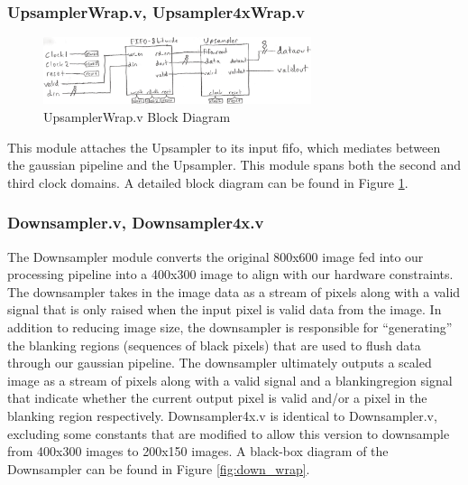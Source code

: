 \documentclass[12pt]{article}
\begin{document}
\subsubsection{UpsamplerWrap.v, Upsampler4xWrap.v}


\begin{figure}
    \centering
    \includegraphics[width=0.7\textwidth]{processed_image_pngs/UpsamplerWrap.png}
    \caption{UpsamplerWrap.v Block Diagram}
    \label{fig:up_wrap}
\end{figure}


This module attaches the Upsampler to its input fifo, which mediates between
the gaussian pipeline and the Upsampler. This module spans both the second and
third clock domains. A detailed block diagram can be found in Figure \ref{fig:up_wrap}.

\subsubsection{Downsampler.v, Downsampler4x.v}


The Downsampler module converts the original 800x600 image fed into our processing
pipeline into a 400x300 image to align with our hardware constraints. The downsampler
takes in the image data as a stream of pixels along with a valid signal that is
only raised when the input pixel is valid data from the image. In addition to 
reducing image size, the downsampler is responsible for ``generating'' the 
blanking regions (sequences of black pixels) that are used to flush data 
through our gaussian pipeline. The downsampler ultimately outputs a scaled 
image as a stream of pixels along with a valid signal and a blankingregion 
signal that indicate whether the current output pixel is valid and/or a pixel
in the blanking region respectively. Downsampler4x.v is identical to 
Downsampler.v, excluding some constants that are modified to allow this version 
to downsample from 400x300 images to 200x150 images. A black-box diagram of the Downsampler
can be found in Figure \ref{fig:down_wrap}.
\end{document}
